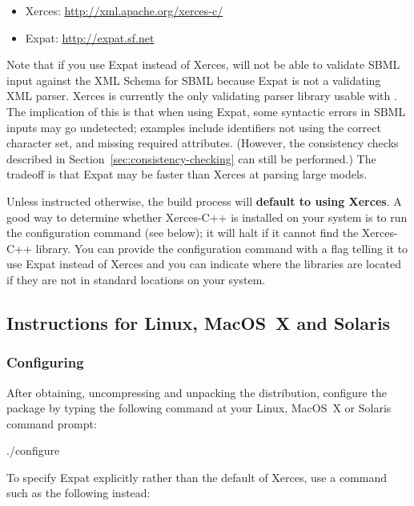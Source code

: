 \documentclass{sbmlmanual}
\begin{document}
\begin{itemize}\setlength{\parskip}{-0.25ex}

\item Xerces: \url{http://xml.apache.org/xerces-c/}
\item Expat: \url{http://expat.sf.net}

\end{itemize}

Note that if you use Expat instead of Xerces, \libsbml{} will not be able
to validate SBML input against the XML Schema for SBML because Expat is not
a validating XML parser.  Xerces is currently the only validating parser
library usable with \libsbml{}.  The implication of this is that when using
Expat, some syntactic errors in SBML inputs may go undetected; examples
include identifiers not using the correct character set, and missing
required attributes.  (However, the \libsbml{} consistency checks described
in Section~\ref{sec:consistency-checking} can still be performed.)  The
tradeoff is that Expat may be faster than Xerces at parsing large models.

Unless instructed otherwise, the \libsbml{} build process will
\textbf{default to using Xerces}.  A good way to determine whether
Xerces-C++ is installed on your system is to run the configuration command
(see below); it will halt if it cannot find the Xerces-C++ library.  You
can provide the configuration command with a flag telling it to use Expat
instead of Xerces and you can indicate where the libraries are located if
they are not in standard locations on your system.
  

\subsection{Instructions for Linux, MacOS~X and Solaris}

\subsubsection{Configuring \libsbml{}}

After obtaining, uncompressing and unpacking the \libsbml{} distribution,
configure the package by typing the following command at your Linux,
MacOS~X or Solaris command prompt:

\begin{shellVerbatim}
  ./configure
\end{shellVerbatim}

To specify Expat explicitly rather than the \libsbml{} default of Xerces,
use a command such as the following instead:
\end{document}
